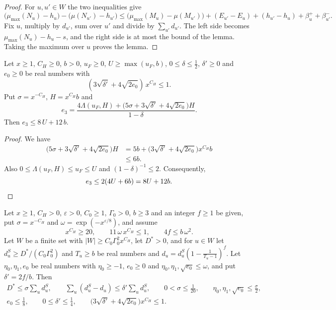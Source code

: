 \begin{proof}
For $u,u'\in W$ the two inequalities give
\[
\big(\mu_{\max}(N_u)-h_u\big)-\big(\mu(N_{u'})-h_{u'}\big)\le\big(\mu_{\max}(M_u)-\mu(M_{u'})\big)+(E_{u'}-E_u)+(h_{u'}-h_u)+\beta^+_u+\beta^-_{u'} .
\]
Fix $u$, multiply by $d_{u'}$, sum over $u'$ and divide by $\sum_{u'}d_{u'}$. The left side becomes $\mu_{\max}(N_u)-h_u-s$, and the right side is at most the bound of the lemma. Taking the maximum over $u$ proves the lemma.
\end{proof}

\begin{corollary}[size of $e_3$]\label{r3:size}
Let $x\ge1$, $C_H\ge0$, $b>0$, $u_F\ge0$,
$U\ge\max(u_F,b)$, $0\le\delta\le\frac12$,
$\delta'\ge0$ and $e_0\ge0$ be real numbers with
\[
(3\sqrt{\delta'}+4\sqrt{2e_0})\,x^{C_H}\le1.
\]
Put $\sigma=x^{-C_H}$, $H=x^{C_H}b$ and
\[
e_3=
\frac{4\Lambda(u_F,H)
+\big(5\sigma+3\sqrt{\delta'}+4\sqrt{2e_0}\big)H}
{1-\delta}.
\]
Then $e_3\le8\,U+12\,b$.
\end{corollary}

\begin{proof}
We have
\[
\begin{aligned}
\big(5\sigma+3\sqrt{\delta'}+4\sqrt{2e_0}\big)H
&=5b+\big(3\sqrt{\delta'}+4\sqrt{2e_0}\big)x^{C_H}b\\
&\le6b.
\end{aligned}
\]
Also $0\le\Lambda(u_F,H)\le u_F\le U$ and
$(1-\delta)^{-1}\le2$.
Consequently,
\[
e_3\le2(4U+6b)=8U+12b.
\qedhere
\]
\end{proof}

\begin{lemma}\label{r3:sizecond}
Let $x\ge1$, $C_H>0$, $\varepsilon>0$, $C_0\ge1$, $\Gamma_0>0$, $b\ge3$ and an integer $f\ge1$ be given, put $\sigma=x^{-C_H}$ and $\omega=\exp(-x^{\varepsilon/8})$, and assume
\[
x^{C_H}\ge20,\qquad11\,\omega\,x^{C_H}\le1,\qquad4f\le b\,\omega^2 .
\]
Let $W$ be a finite set with $\lvert W\rvert\ge C_0\Gamma_0^2x^{C_H}$, let $D^*>0$, and for $u\in W$ let $d^S_u\ge D^*/(C_0\Gamma_0^2)$ and $T_u\ge b$ be real numbers and $d_u=d^S_u(1-\frac1{T_u-1})^f$. Let $\eta_0,\eta_1,e_0$ be real numbers with $\eta_0\ge-1$, $e_0\ge0$ and $\eta_0,\eta_1,\sqrt{e_0}\le\omega$, and put $\delta'=2f/b$. Then
\begin{gather*}
D^*\le\sigma\sum_ud^S_u,\qquad\sum_u(d^S_u-d_u)\le\delta'\sum_ud^S_u,\qquad0<\sigma\le\tfrac1{20},\qquad\eta_0,\eta_1,\sqrt{e_0}\le\tfrac\sigma2,\\
e_0\le\tfrac18,\qquad0\le\delta'\le\tfrac14,\qquad\big(3\sqrt{\delta'}+4\sqrt{2e_0}\big)x^{C_H}\le1 .
\end{gather*}
\end{lemma}

